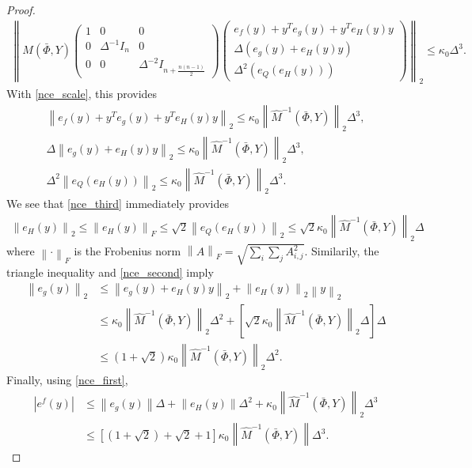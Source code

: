 \documentclass{article}
\begin{document}
\begin{proof}
\begin{align*}
\left\|M\left(\bar \Phi, Y\right)\begin{pmatrix}
1 & 0 & 0 \\
0 & \Delta^{-1} I_n & 0 \\
0 & 0 & \Delta^{-2} I_{n + \frac{n(n-1)}{2}}
\end{pmatrix}
\begin{pmatrix}
e_f(y) + y^Te_g(y) + y^Te_H(y) y \\
\Delta\left(e_g(y) + e_H(y) y\right) \\
\Delta^2\left(e_Q\left(e_H(y)\right)\right)
\end{pmatrix} \right\|_2
\le \kappa_0 \Delta^3.
\end{align*}
With \cref{nce_scale}, this provides
\begin{align}
\left\|e_f(y) + y^Te_g(y) + y^Te_H(y) y \right\|_2\le \kappa_0 \left\|\hat M^{-1}(\bar \Phi, Y) \right\|_2 \Delta^3, \label{nce_first}\\
\Delta \left\|e_g(y) + e_H(y) y \right\|_2 \le \kappa_0 \left\|\hat M^{-1}(\bar \Phi, Y) \right\|_2  \Delta^3, \label{nce_second} \\
\Delta^2 \left\|e_Q\left(e_H(y)\right)\right\|_2 \le \kappa_0 \left\|\hat M^{-1}(\bar \Phi, Y) \right\|_2  \Delta^3. \label{nce_third}
\end{align}
We see that \cref{nce_third} immediately provides
\begin{align*}
\left\|e_H(y)\right\|_2 
\le \left\|e_H(y)\right\|_F 
\le \sqrt{2} \left\|e_Q\left(e_H(y)\right)\right\|_2
\le \sqrt{2}\kappa_0 \left\|\hat M^{-1}(\bar \Phi, Y) \right\|_2 \Delta
\end{align*}
where $\left\|\cdot\right\|_F$ is the Frobenius norm $\left\|A\right\|_F = \sqrt{\sum_i\sum_jA_{i, j}^2}$.
Similarily, the triangle inequality and \cref{nce_second} imply
\begin{align*}
\left\|e_g\left(y\right)\right\|_2 &\le \left\|e_g(y) + e_H(y) y \right\|_2 + \left\|e_H\left(y\right)\right\|_2\left\| y\right\|_2 \\
&\le \kappa_0 \left\|\hat M^{-1}(\bar \Phi, Y) \right\|_2 \Delta^2
+ \left[\sqrt{2}\kappa_0 \left\|\hat M^{-1}(\bar \Phi, Y) \right\|_2 \Delta\right]
\Delta \\
&\le\left(1 + \sqrt 2\right)\kappa_0\left\|\hat M^{-1}(\bar \Phi, Y) \right\|_2 \Delta^2.
\end{align*}
Finally, using \cref{nce_first},
\begin{align*}
\left|e^f\left(y\right)\right| &\le \left\|e_g(y)\right\| \Delta + \left\|e_H(y)\right\|\Delta^2
+ \kappa_0 \left\|\hat M^{-1}(\bar \Phi, Y) \right\|_2 \Delta^3 \\
&\le\left[\left(1 + \sqrt 2\right) + \sqrt{2} + 1\right]\kappa_0 \left\|\hat M^{-1}(\bar \Phi, Y) \right\|\Delta^3.
\end{align*}
\end{proof}
\end{document}
